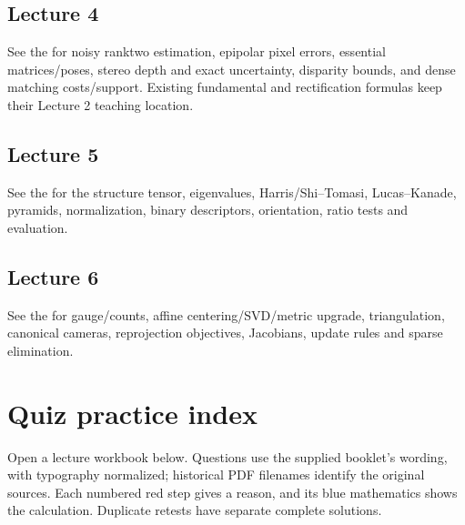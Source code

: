 \documentclass[letterpaper,11pt,english,openany,oneside]{jupyterBook}
\begin{document}
\section{Lecture 4}
\label{\detokenize{reference/formulas:lecture-4}}
\sphinxAtStartPar
See the {\hyperref[\detokenize{lectures/lecture04/review::doc}]{}} for noisy rank\sphinxhyphen{}two estimation, epipolar pixel errors, essential matrices/poses, stereo depth and exact uncertainty, disparity bounds, and dense matching costs/support. Existing fundamental and rectification formulas keep their Lecture 2 teaching location.


\section{Lecture 5}
\label{\detokenize{reference/formulas:lecture-5}}
\sphinxAtStartPar
See the {\hyperref[\detokenize{lectures/lecture05/review::doc}]{}} for the structure tensor, eigenvalues, Harris/Shi–Tomasi, Lucas–Kanade, pyramids, normalization, binary descriptors, orientation, ratio tests and evaluation.


\section{Lecture 6}
\label{\detokenize{reference/formulas:lecture-6}}
\sphinxAtStartPar
See the {\hyperref[\detokenize{lectures/lecture06/review::doc}]{}} for gauge/counts, affine centering/SVD/metric upgrade, triangulation, canonical cameras, reprojection objectives, Jacobians, update rules and sparse elimination.

\sphinxstepscope


\chapter{Quiz practice index}
\label{\detokenize{reference/quiz-index:quiz-practice-index}}\label{\detokenize{reference/quiz-index:quiz-index}}\label{\detokenize{reference/quiz-index::doc}}
\sphinxAtStartPar
{} Open a lecture workbook below. Questions use the supplied booklet’s wording, with typography normalized; historical PDF filenames identify the original sources. Each numbered red step gives a reason, and its blue mathematics shows the calculation. Duplicate retests have separate complete solutions.
\end{document}
